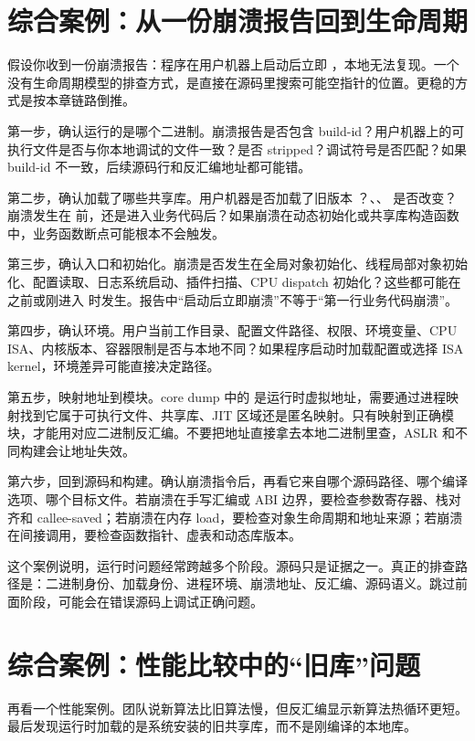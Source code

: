 \section{综合案例：从一份崩溃报告回到生命周期}

假设你收到一份崩溃报告：程序在用户机器上启动后立即 ，本地无法复现。一个没有生命周期模型的排查方式，是直接在源码里搜索可能空指针的位置。更稳的方式是按本章链路倒推。

第一步，确认运行的是哪个二进制。崩溃报告是否包含 build-id？用户机器上的可执行文件是否与你本地调试的文件一致？是否 stripped？调试符号是否匹配？如果 build-id 不一致，后续源码行和反汇编地址都可能错。

第二步，确认加载了哪些共享库。用户机器是否加载了旧版本 ？、、 是否改变？崩溃发生在  前，还是进入业务代码后？如果崩溃在动态初始化或共享库构造函数中，业务函数断点可能根本不会触发。

第三步，确认入口和初始化。崩溃是否发生在全局对象初始化、线程局部对象初始化、配置读取、日志系统启动、插件扫描、CPU dispatch 初始化？这些都可能在  之前或刚进入  时发生。报告中“启动后立即崩溃”不等于“第一行业务代码崩溃”。

第四步，确认环境。用户当前工作目录、配置文件路径、权限、环境变量、CPU ISA、内核版本、容器限制是否与本地不同？如果程序启动时加载配置或选择 ISA kernel，环境差异可能直接决定路径。

第五步，映射地址到模块。core dump 中的  是运行时虚拟地址，需要通过进程映射找到它属于可执行文件、共享库、JIT 区域还是匿名映射。只有映射到正确模块，才能用对应二进制反汇编。不要把地址直接拿去本地二进制里查，ASLR 和不同构建会让地址失效。

第六步，回到源码和构建。确认崩溃指令后，再看它来自哪个源码路径、哪个编译选项、哪个目标文件。若崩溃在手写汇编或 ABI 边界，要检查参数寄存器、栈对齐和 callee-saved；若崩溃在内存 load，要检查对象生命周期和地址来源；若崩溃在间接调用，要检查函数指针、虚表和动态库版本。

这个案例说明，运行时问题经常跨越多个阶段。源码只是证据之一。真正的排查路径是：二进制身份、加载身份、进程环境、崩溃地址、反汇编、源码语义。跳过前面阶段，可能会在错误源码上调试正确问题。

\section{综合案例：性能比较中的“旧库”问题}

再看一个性能案例。团队说新算法比旧算法慢，但反汇编显示新算法热循环更短。最后发现运行时加载的是系统安装的旧共享库，而不是刚编译的本地库。

